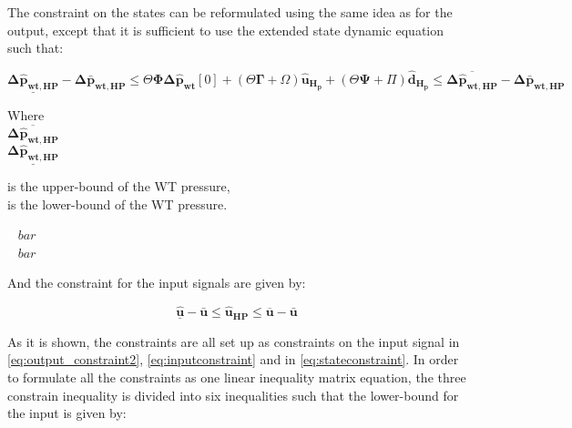 

The constraint on the states can be reformulated using the same idea as for the output, except that it is sufficient to use the extended state dynamic equation such that: 

\begin{equation}
	\underline{\bm{\Delta \hat{p}_{wt,HP}}} - \bm{\Delta \bar{p}_{wt,HP}} \leq \Theta \bm{\Phi} \bm{\Delta \hat{p}_{wt}}[0] +  (\Theta \bm{\Gamma}+  \Omega) \bm{\hat{u}_{H_p}} + (\Theta \bm{\Psi} + \Pi)  \bm{\hat{d}_{H_p}} \leq \overline{\bm{\Delta \hat{p}_{wt,HP}}} - \bm{\Delta \bar{p}_{wt,HP}} 
	\label{eq:stateconstraint}
\end{equation}

\begin{minipage}[t]{0.20\textwidth}
Where\\
\hspace*{8mm} $ \overline{\bm{\Delta \hat{p}_{wt,HP}}} $ \\
\hspace*{8mm} $ \underline{\bm{\Delta \hat{p}_{wt,HP}}} $ 
\end{minipage}
\begin{minipage}[t]{0.68\textwidth}
\vspace*{2mm}
is the upper-bound of the WT pressure, \\
is the lower-bound of the WT pressure. 
\end{minipage}
\begin{minipage}[t]{0.10\textwidth}
\vspace*{1.8mm}
\textcolor{White}{te}$\unit{bar}$\\
\textcolor{White}{te}$\unit{bar}$
\end{minipage}

And the constraint for the input signals are given by: 

\begin{equation}
\underline{\bm{\hat{u}}} - \bm{\bar{u}} \leq \bm{\hat{u}_{HP}} \leq \overline{\bm{{u}}} - \bm{\bar{u}}
\label{eq:inputconstraint}
\end{equation}

As it is shown, the constraints are all set up as constraints on the input signal in \eqref{eq:output_constraint2}, \eqref{eq:inputconstraint} and in \eqref{eq:stateconstraint}. In order to formulate all the constraints as one linear inequality matrix equation, the three constrain inequality is divided into six inequalities such that the lower-bound for the input is given by:


